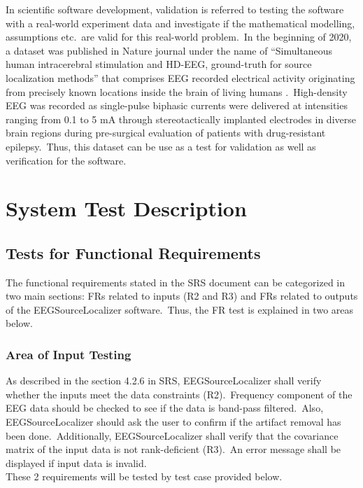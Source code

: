 \documentclass[12pt, titlepage]{article}
\renewcommand{\progname}{EEGSourceLocalizer}
\begin{document}
In scientific software development, validation is referred to testing the software with a real-world experiment data and investigate if the mathematical modelling, assumptions etc.\ are valid for this real-world problem.\ In the beginning of 2020, a dataset was published in Nature journal under the name of \enquote{Simultaneous human intracerebral stimulation and HD-EEG, ground-truth for source localization methods} that comprises EEG recorded electrical activity originating from precisely known locations inside the brain of living humans \cite{Mikulan2020}.\ High-density EEG was recorded as single-pulse biphasic currents were delivered at intensities ranging from 0.1 to 5 mA through stereotactically implanted electrodes in diverse brain regions during pre-surgical evaluation of patients with drug-resistant epilepsy.\ Thus, this dataset can be use as a test for validation as well as verification for the software.\\

\section{System Test Description}
	
\subsection{Tests for Functional Requirements}

The functional requirements stated in the SRS document can be categorized in two main sections: FRs related to inputs (R2 and R3) and FRs related to outputs of the \progname{} software.\ Thus, the FR test is explained in two areas below.

%

\subsubsection{Area of Input Testing}

As described in the section 4.2.6 in SRS, \progname{} shall verify whether the inputs meet the data constraints (R2).\ Frequency component of the EEG data should be checked to see if the data is band-pass filtered.\ Also, \progname{}  should ask the user to confirm if the artifact removal has been done.\ Additionally, \progname{} shall verify that the covariance matrix of the input data is not rank-deficient (R3).\ An error message shall be displayed if input data is invalid.\\
These 2 requirements will be tested by test case provided below.
\end{document}
